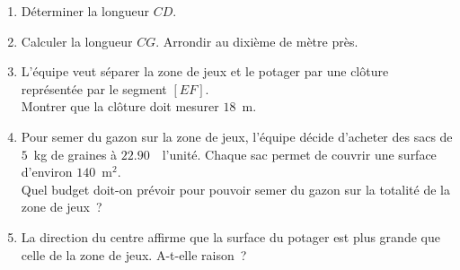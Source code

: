 \documentclass[exercice]{thedocument}%
\begin{document}
\begin{enumerate}
    \item Déterminer la longueur $CD$.
    \item Calculer la longueur $CG$. Arrondir au dixième de mètre près.
    \item L'équipe veut séparer la zone de jeux et le potager par une clôture représentée par le segment $[EF]$.\\
    Montrer que la clôture doit mesurer $18$~m.
    \item Pour semer du gazon sur la zone de jeux, l'équipe décide d'acheter des sacs de $5$~kg de graines à $22.90$~\texteuro\, l'unité. Chaque sac permet de couvrir une surface d'environ $140$~m$^2$.\\
    Quel budget doit-on prévoir pour pouvoir semer du gazon sur la totalité de la zone de jeux~?
    \item La direction du centre affirme que la surface du potager est plus grande que celle de la zone de jeux. A-t-elle raison~?
\end{enumerate}
\showthesource
\end{document}
